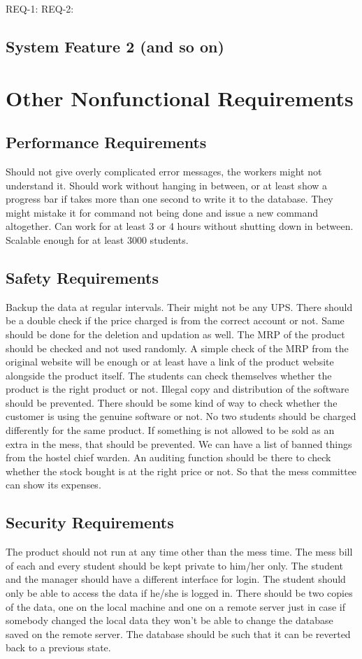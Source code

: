 \documentclass{scrreprt}
\begin{document}
REQ-1:	REQ-2:

\section{System Feature 2 (and so on)}


\chapter{Other Nonfunctional Requirements}

\section{Performance Requirements}
Should not give overly complicated error messages, the workers might not understand it.
Should work without hanging in between, or at least show a progress bar if takes more than one second to write it to the database.
They might mistake it for command not being done and issue a new command altogether.
Can work for at least 3 or 4 hours without shutting down in between.
Scalable enough for at least 3000 students.

\section{Safety Requirements}
Backup the data at regular intervals. Their might not be any UPS.
There should be a double check if the price charged is from the correct account or not. Same should be done for the deletion and updation as well. The MRP of the product should be checked and not used randomly. A simple check of the MRP from the original website will be enough or at least have a link of the product website alongside the product itself. The students can check themselves whether the product is the right product or not.
Illegal copy and distribution of the software should be prevented.
There should be some kind of way to check whether the customer is using the genuine software or not.
No two students should be charged differently for the same product.
If something is not allowed to be sold as an extra in the mess, that should be prevented. We can have a list of banned things from the hostel chief warden.
An auditing function should be there to check whether the stock bought is at the right price or not. So that the mess committee can show its expenses.

\section{Security Requirements}
The product should not run at any time other than the mess time.
The mess bill of each and every student should be kept private to him/her only. The student and the manager should have a different interface for login. The student should only be able to access the data if he/she is logged in.
There should be two copies of the data, one on the local machine and one on a remote server just in case if somebody changed the local data they won't be able to change the database saved on the remote server.
The database should be such that it can be reverted back to a previous state.
\end{document}
